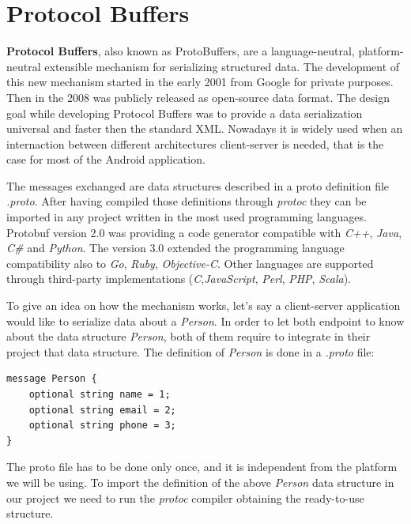 	\section{Protocol Buffers}
	\label{sec:protocol_buffer}
		\par \textbf{Protocol Buffers}\cite{protocol_buffer}, also known as ProtoBuffers, are a language-neutral, platform-neutral extensible mechanism for serializing structured data. The development of this new mechanism started in the early 2001 from Google for private purposes. Then in the 2008 was publicly released as open-source data format. The design goal while developing Protocol Buffers was to provide a data serialization universal and faster then the standard XML. Nowadays it is widely used when an internaction between different architectures client-server is needed, that is the case for most of the Android application.
		\par The messages exchanged are data structures described in a proto definition file \textit{.proto}. After having compiled those definitions through \textit{protoc} they can be imported in any project written in the most used programming languages. Protobuf version 2.0 was providing a code generator compatible with \textit{C++}, \textit{Java}, \textit{C\#} and \textit{Python}. The version 3.0 extended the programming language compatibility also to \textit{Go}, \textit{Ruby}, \textit{Objective-C}. Other languages are supported through third-party implementations (\textit{C},\textit{JavaScript}, \textit{Perl}, \textit{PHP}, \textit{Scala}). 
		\par To give an idea on how the mechanism works, let's say a client-server application would like to serialize data about a \textit{Person}. In order to let both endpoint to know about the data structure \textit{Person}, both of them require to integrate in their project that data structure. The definition of \textit{Person} is done in a \textit{.proto} file:
\begin{lstlisting}
message Person {
	optional string name = 1;
	optional string email = 2;
	optional string phone = 3;
}
\end{lstlisting}	
		The proto file has to be done only once, and it is independent from the platform we will be using. To import the definition of the above \textit{Person} data structure in our project we need to run the \textit{protoc} compiler obtaining the ready-to-use structure. \newline
